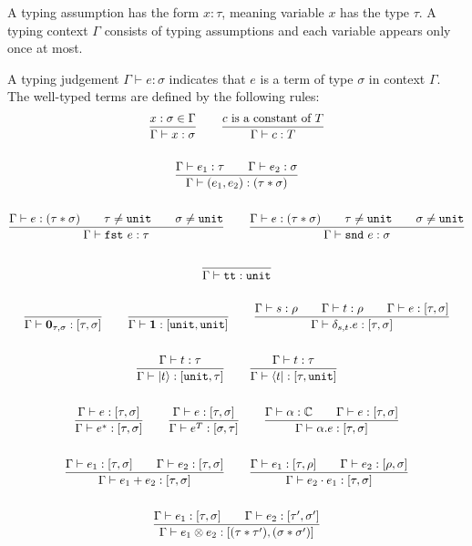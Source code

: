 \begin{definition}
  A typing assumption has the form $x : \tau$, meaning variable $x$ has the type $\tau$. A typing context $\Gamma$ consists of typing assumptions and each variable appears only once at most.

  A typing judgement $\Gamma \vdash e : \sigma$ indicates that $e$ is a term of type $\sigma$ in context $\Gamma$. The well-typed terms are defined by the following rules:
  \begin{gather*}
    \frac{x : \sigma \in \Gamma}{\Gamma \vdash x : \sigma}
    \qquad \frac{c\ \textrm{is a constant of}\ T}{\Gamma \vdash c : T}\\
    \\
    \frac{\Gamma \vdash e_1 : \tau \qquad \Gamma \vdash e_2 : \sigma}{\Gamma \vdash (e_1, e_2) : ( \tau * \sigma )} \\
    \\
    \frac{\Gamma \vdash e : ( \tau * \sigma ) \qquad \tau \neq \texttt{unit} \qquad \sigma \neq \texttt{unit}}{\Gamma \vdash \texttt{fst}\ e : \tau}
    \qquad
    \frac{\Gamma \vdash e : ( \tau * \sigma ) \qquad \tau \neq \texttt{unit} \qquad \sigma \neq \texttt{unit}}{\Gamma \vdash \texttt{snd}\ e : \sigma} \\
    \\
    \frac{}{\Gamma \vdash \texttt{tt} : \texttt{unit}}\\
    \ \\
    \frac{}{\Gamma \vdash \mathbf{0}_{\tau, \sigma} : [\tau, \sigma]}
    \qquad
    \frac{}{\Gamma \vdash \mathbf{1} : [\texttt{unit}, \texttt{unit}]}
    \qquad
    \frac{\Gamma \vdash s : \rho \qquad \Gamma \vdash t : \rho \qquad \Gamma \vdash e : [\tau, \sigma]}{\Gamma \vdash \delta_{s, t}.e : [\tau, \sigma]}\\
    \ \\
    \frac{\Gamma \vdash t : \tau}{\Gamma \vdash |t\rangle : [\texttt{unit}, \tau]}
    \qquad 
    \frac{\Gamma \vdash t : \tau}{\Gamma \vdash \langle t| : [\tau, \texttt{unit}]}\\
    \ \\
    \frac{\Gamma \vdash e : [\tau, \sigma]}{\Gamma \vdash e^* : [\tau, \sigma]}
    \qquad
    \frac{\Gamma \vdash e : [\tau, \sigma]}{\Gamma \vdash e^T : [\sigma, \tau]} 
    \qquad
    \frac{\Gamma \vdash \alpha : \mathbb{C} \qquad \Gamma \vdash e : [\tau, \sigma]}{\Gamma \vdash \alpha.e : [\tau, \sigma]}\\
    \ \\
    \frac{\Gamma \vdash e_1 : [\tau, \sigma] \qquad \Gamma \vdash e_2 : [\tau, \sigma] }{\Gamma \vdash e_1 + e_2 : [\tau, \sigma] }
    \qquad 
    \frac{\Gamma \vdash e_1 : [\tau, \rho] \qquad \Gamma \vdash e_2 : [\rho, \sigma] }{\Gamma \vdash e_2 \cdot e_1 : [\tau, \sigma] } \\
    \ \\
    \frac{\Gamma \vdash e_1 : [\tau, \sigma] \qquad \Gamma \vdash e_2 : [\tau', \sigma'] }{\Gamma \vdash e_1 \otimes e_2 : [(\tau * \tau'), (\sigma * \sigma')]}
  \end{gather*}
\end{definition}

